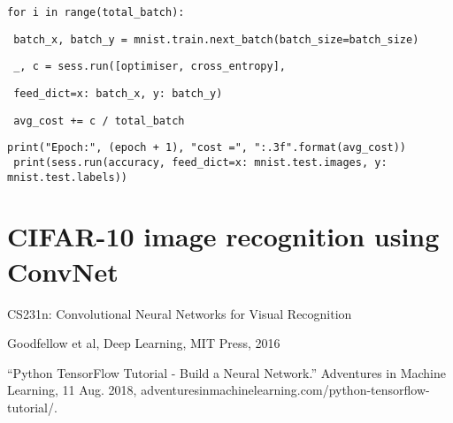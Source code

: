 \documentclass[letterpaper]{article}
\begin{document}
\begin{appendices}
\texttt{\hspace{1em}for i in range(total\_batch):}

\texttt{\hspace{2em} batch\_x, batch\_y = mnist.train.next\_batch(batch\_size=batch\_size)}

\texttt{\hspace{2em} \_, c = sess.run([optimiser, cross\_entropy],}

\texttt{\hspace{5em} feed\_dict={x: batch\_x, y: batch\_y})\\}

\texttt{\hspace{1em} avg\_cost += c / total\_batch}

\texttt{print("Epoch:", (epoch + 1), "cost =", "{:.3f}".format(avg\_cost))\\}
\texttt{\hspace{1em} print(sess.run(accuracy, feed\_dict={x: mnist.test.images, y: mnist.test.labels}))\\}
	
	
\section{CIFAR-10 image recognition using ConvNet}



\end{appendices}

\begin{thebibliography}{9}
CS231n: Convolutional Neural Networks for Visual Recognition

Goodfellow et al, Deep Learning, MIT Press, 2016

“Python TensorFlow Tutorial - Build a Neural Network.” Adventures in Machine Learning, 11 Aug. 2018, adventuresinmachinelearning.com/python-tensorflow-tutorial/.

\end{thebibliography}
\end{document}
